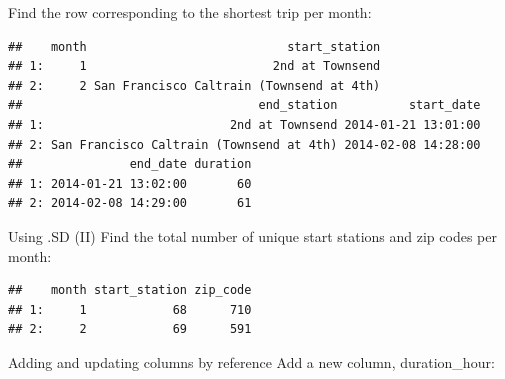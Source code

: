 \documentclass[]{book}
\newenvironment{Shaded}{\begin{snugshade}}{\end{snugshade}}
\newcommand{\DecValTok}[1]{\textcolor[rgb]{0.00,0.00,0.81}{#1}}
\newcommand{\KeywordTok}[1]{\textcolor[rgb]{0.13,0.29,0.53}{\textbf{#1}}}
\newcommand{\NormalTok}[1]{#1}
\newcommand{\OperatorTok}[1]{\textcolor[rgb]{0.81,0.36,0.00}{\textbf{#1}}}
\newcommand{\StringTok}[1]{\textcolor[rgb]{0.31,0.60,0.02}{#1}}
\begin{document}
Find the row corresponding to the shortest trip per month:

\begin{Shaded}
\end{Shaded}

\begin{verbatim}
##    month                            start_station
## 1:     1                          2nd at Townsend
## 2:     2 San Francisco Caltrain (Townsend at 4th)
##                                 end_station          start_date
## 1:                          2nd at Townsend 2014-01-21 13:01:00
## 2: San Francisco Caltrain (Townsend at 4th) 2014-02-08 14:28:00
##               end_date duration
## 1: 2014-01-21 13:02:00       60
## 2: 2014-02-08 14:29:00       61
\end{verbatim}

Using .SD (II)
Find the total number of unique start stations and zip codes per month:

\begin{Shaded}
\end{Shaded}

\begin{verbatim}
##    month start_station zip_code
## 1:     1            68      710
## 2:     2            69      591
\end{verbatim}

Adding and updating columns by reference
Add a new column, duration\_hour:
\end{document}
